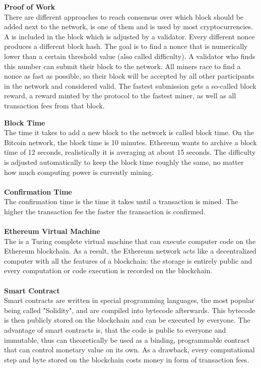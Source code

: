 \textbf{Proof of Work}\\
There are different approaches to reach consensus over which block should be added next to the network,  is one of them and is used by most cryptocurrencies.
A  is included in the block which is adjusted by a validator.
Every different nonce produces a different block hash.
The goal is to find a nonce that is numerically lower than a certain threshold value (also called difficulty).
A validator who finds this number can submit their block to the network.
All miners race to find a nonce as fast as possible, so their block will be accepted by all other participants in the network and considered valid.
The fastest submission gets a so-called block reward, a reward minted by the protocol to the fastest miner, as well as all transaction fees from that block.
\newpage

\textbf{Block Time}\\
The time it takes to add a new block to the network is called block time.
On the Bitcoin network, the block time is 10 minutes\cite{bitcoin-whitepaper}.
Ethereum wants to archive a block time of 12 seconds\cite{ethereum-blocktime}, realistically it is averaging at about 15 seconds\cite{ethereum-blocktime-chart}.
The difficulty is adjusted automatically to keep the block time roughly the same, no matter how much computing power is currently mining.
\\\\

\textbf{Confirmation Time}\\
The confirmation time is the time it takes until a transaction is mined.
The higher the transaction fee the faster the transaction is confirmed.
\\\\

\textbf{Ethereum Virtual Machine}\\
The  is a Turing complete virtual machine that can execute computer code on the Ethereum blockchain.
As a result, the Ethereum network acts like a decentralized computer with all the features of a blockchain: the storage is entirely public and every computation or code execution is recorded on the blockchain.
\\\\

\textbf{Smart Contract}\\
Smart contracts are written in special programming languages, the most popular being called "Solidity", and are compiled into bytecode afterwards.
This bytecode is then publicly stored on the blockchain and can be executed by everyone.
The advantage of smart contracts is, that the code is public to everyone and immutable, thus can theoretically be used as a binding, programmable contract that can control monetary value on its own.
As a drawback, every computational step and byte stored on the blockchain costs money in form of transaction fees.
\\\\

